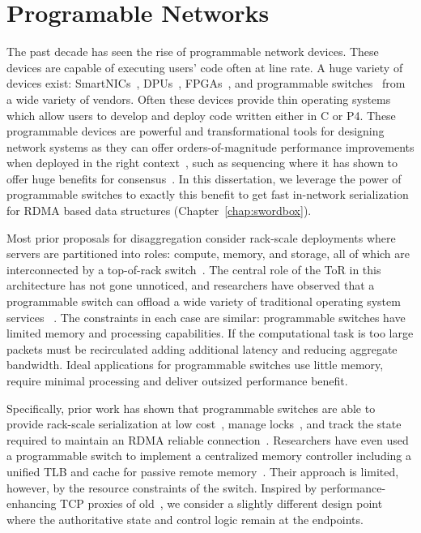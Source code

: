 \documentclass[12pt]{ucsddissertation}
\begin{document}
\section{Programable Networks}
\label{sec:programmable-networks}


The past decade has seen the rise of programmable network devices. These devices are capable of
executing users' code often at line rate. A huge variety of devices exist:
SmartNICs~\cite{fairnic,e3,ipipe,floem}, DPUs~\cite{dsnf},
FPGAs~\cite{azure-smartnic,clio,catapult,supernic}, and programmable
switches~\cite{p4,netchain,netcache,netlock} from a wide variety of vendors. Often these devices
provide thin operating systems which allow users to develop and deploy code written either in C or
P4. These programmable devices are powerful and transformational tools for designing network systems
as they can offer orders-of-magnitude performance improvements when deployed in the right
context~\cite{when-computer}, such as sequencing where it has shown to offer huge benefits for
consensus~\cite{eris, nopaxos}. In this dissertation, we leverage the power of programmable switches
to exactly this benefit to get fast in-network serialization for RDMA based data structures
(Chapter~\ref{chap:swordbox}).

Most prior proposals for disaggregation consider rack-scale deployments where servers are
partitioned into roles: compute, memory, and storage, all of which are interconnected by a
top-of-rack switch~\cite{disandapp,the-machine,intel-rack,firebox,legoos}. The central role of the
ToR in this architecture has not gone unnoticed, and researchers have observed that a programmable
switch can offload a wide variety of traditional operating system services
~\cite{disandapp,netchain,netcache,mind,netlock,netkv}.  The constraints in each case are similar:
programmable switches have limited memory and processing capabilities. If the computational task is
too large packets must be recirculated adding additional latency and reducing aggregate bandwidth.
Ideal applications for programmable switches use little memory, require minimal processing and
deliver outsized performance benefit.

Specifically, prior work has shown that programmable switches are able to provide rack-scale
serialization at low cost~\cite{eris,nopaxos,when-computer}, manage
locks~\cite{netlock}, and track the state required to maintain an RDMA reliable
connection~\cite{tea}. Researchers have even used a programmable switch to implement a centralized
memory controller including a unified TLB and cache for passive remote memory~\cite{mind}. Their
approach is limited, however, by the resource constraints of the switch. Inspired by
performance-enhancing TCP proxies of old~\cite{snoop,rfc3135}, we consider a slightly different
design point where the authoritative state and control logic remain at the endpoints. 
\end{document}
